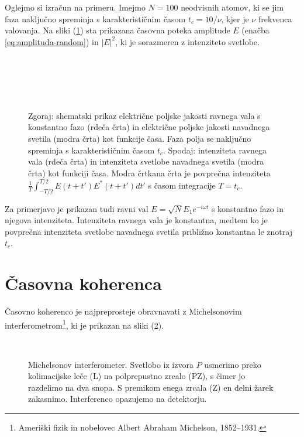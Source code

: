Oglejmo si izračun
na primeru. Imejmo $N=100$ neodvisnih atomov, ki se jim faza naključno
spreminja s karakterističnim časom $t_{c}=10/\nu$, kjer je $\nu$
frekvenca valovanja. Na sliki (\ref{fig:amplituda-intenziteta}) sta
prikazana časovna poteka amplitude $E$ (enačba \ref{eq:amplituda-random})
in $|E|^{2}$, ki je sorazmeren z intenziteto svetlobe.
\begin{figure}
\centering
\def\svgwidth{150truemm} 
\\
\def\svgwidth{150truemm} 
\\
\def\svgwidth{150truemm} 
\\
\def\svgwidth{150truemm} 
\\
\caption{Zgoraj: shematski prikaz električne poljske jakosti 
ravnega vala s konstantno fazo (rdeča črta) in električne
poljske jakosti navadnega svetila (modra črta) kot funkcije
časa. Faza polja se naključno spreminja s karakterističnim časom $t_{c}$.
Spodaj: intenziteta ravnega vala (rdeča črta) in intenziteta
svetlobe navadnega svetila (modra črta) kot funkciji
časa. Modra črtkana črta je povprečna intenziteta 
$\frac{1}{T}\int_{-T/2}^{T/2}E(t+t')E^{*}(t+t')dt'$
s časom integracije $T=t_{c}$. }
\label{fig:amplituda-intenziteta}
\end{figure}
Za primerjavo je prikazan tudi ravni val $E=\sqrt{N}E_{1}e^{-i\omega t}$
s konstantno fazo in njegova intenziteta. Intenziteta ravnega vala je konstantna, 
medtem ko je povprečna intenziteta svetlobe navadnega svetila približno 
konstantna le znotraj $t_{c}$.

\section{Časovna koherenca}
\label{sec:casovna-koherenca}

Časovno koherenco je najpreprosteje obravnavati 
z Michelsonovim 
interferometrom\footnote{Ameriški fizik in nobelovec Albert Abraham Michelson, 1852--1931.},
ki je prikazan na sliki (\ref{fig:michelson}). 
\begin{figure}[!h]
\centering
\def\svgwidth{85truemm} 
\\
\caption{\label{fig:michelson}Michelsonov interferometer. Svetlobo
iz izvora $P$ usmerimo preko kolimacijske leče (L) na polprepustno
zrcalo (PZ), s čimer jo razdelimo na dva snopa. S premikom
enega zrcala (Z) en delni žarek zakasnimo. Interferenco opazujemo na detektorju.}
\end{figure}

